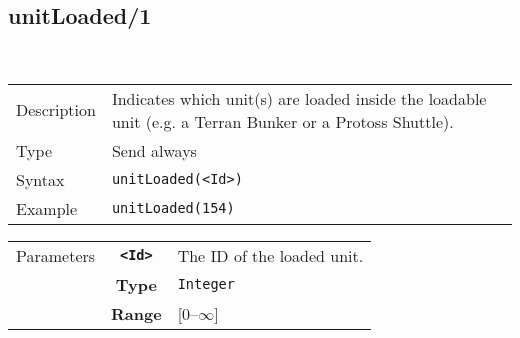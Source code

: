 \subsection{unitLoaded/1}\
\begin{tabularx}{\textwidth}{lX}
 Description & Indicates which unit(s) are loaded inside the loadable unit (e.g. a Terran Bunker or a Protoss Shuttle).\\
 Type & Send always \\
 Syntax & \verb|unitLoaded(<Id>)| \\
 Example & \verb|unitLoaded(154)| \\
 \end{tabularx}
 \begin{tabularx}{\textwidth}{l | c | p{8cm}|}
 \cline{2-3}
 Parameters & \textbf{\verb|<Id>|} & The ID of the loaded unit. \\
            & \textbf{Type} & \verb|Integer| \\
            & \textbf{Range} & [0--$\infty$] \\
            \cline{2-3}
\end{tabularx}